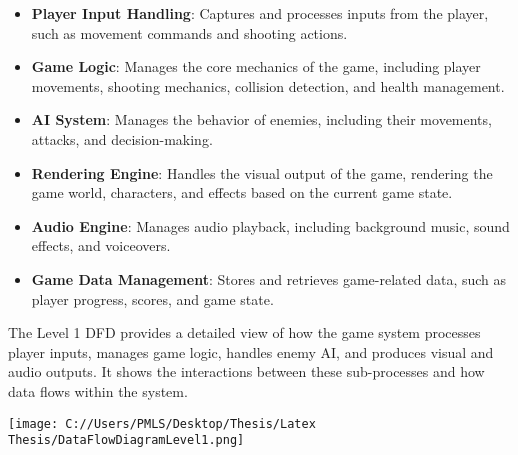\begin{itemize}
	\item \textbf{Player Input Handling}: Captures and processes inputs from the player, such as movement commands and shooting actions.
	\item \textbf{Game Logic}: Manages the core mechanics of the game, including player movements, shooting mechanics, collision detection, and health management.
	\item \textbf{AI System}: Manages the behavior of enemies, including their movements, attacks, and decision-making.
	\item \textbf{Rendering Engine}: Handles the visual output of the game, rendering the game world, characters, and effects based on the current game state.
	\item \textbf{Audio Engine}: Manages audio playback, including background music, sound effects, and voiceovers.
	\item \textbf{Game Data Management}: Stores and retrieves game-related data, such as player progress, scores, and game state.
\end{itemize}

The Level 1 DFD provides a detailed view of how the game system processes player inputs, manages game logic, handles enemy AI, and produces visual and audio outputs. It shows the interactions between these sub-processes and how data flows within the system.

\texttt{[image: C://Users/PMLS/Desktop/Thesis/Latex Thesis/DataFlowDiagramLevel1.png]}


